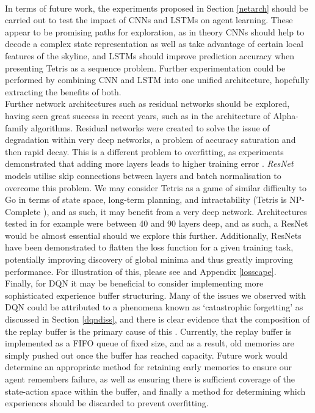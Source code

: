 \documentclass[12pt]{article}
\begin{document}
\\\newline In terms of future work, the experiments proposed in Section \ref{netarch} should be carried out to test the impact of CNNs and LSTMs on agent learning. These appear to be promising paths for exploration, as in theory CNNs should help to decode a complex state representation as well as take advantage of certain local features of the skyline, and LSTMs should improve prediction accuracy when presenting Tetris as a sequence problem. Further experimentation could be performed by combining CNN and LSTM into one unified architecture, hopefully extracting the benefits of both. 
\\\newline Further network architectures such as residual networks \autocite{he2016deep} should be explored, having seen great success in recent years, such as in the architecture of Alpha-family algorithms. Residual networks were created to solve the issue of degradation within very deep networks, a problem of accuracy saturation and then rapid decay. This is a different problem to overfitting, as experiments demonstrated that adding more layers leads to higher training error \autocite{he2015convolutional}. \textit{ResNet} models utilise skip connections between layers and batch normalisation to overcome this problem. We may consider Tetris as a game of similar difficulty to Go in terms of state space, long-term planning, and intractability (Tetris is NP-Complete \autocite{demaine2003tetris}), and as such, it may benefit from a very deep network. Architectures tested in \textcite{Silver2017} for example were between 40 and 90 layers deep, and as such, a ResNet would be almost essential should we explore this further. Additionally, ResNets have been demonstrated to flatten the loss function for a given training task, potentially improving discovery of global minima and thus greatly improving performance. For illustration of this, please see \textcite{li2018visualizing} and Appendix \ref{losscape}.\\\newline
Finally, for DQN it may be beneficial to consider implementing more sophisticated experience buffer structuring. Many of the issues we observed with DQN could be attributed to a phenomena known as `catastrophic forgetting' as discussed in Section \ref{dqndiss}, and there is clear evidence that the composition of the replay buffer is the primary cause of this \autocite{de2015importance}. Currently, the replay buffer is implemented as a FIFO queue of fixed size, and as a result, old memories are simply pushed out once the buffer has reached capacity. Future work would determine an appropriate method for retaining early memories to ensure our agent remembers failure, as well as ensuring there is sufficient coverage of the state-action space within the buffer, and finally a method for determining which experiences should be discarded to prevent overfitting. 
\end{document}
